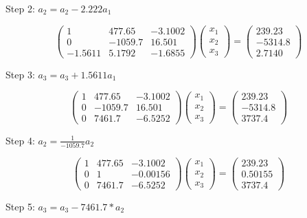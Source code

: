 \documentclass[]{article}
\begin{document}
Step 2: \(a_2 = a_2 - 2.222a_1\)

\[
\left(\begin{array}{ccc} 
1 & 477.65 & -3.1002\\
0 & -1059.7 & 16.501\\
-1.5611 & 5.1792 & -1.6855
\end{array}\right)
\left(\begin{array}{c} 
x_1 \\
x_2 \\
x_3
\end{array}\right) =
\left(\begin{array}{c}
239.23 \\
-5314.8 \\
2.7140
\end{array}\right)
\]

Step 3: \(a_3 = a_3 + 1.5611a_1\)

\[
\left(\begin{array}{ccc} 
1 & 477.65 & -3.1002\\
0 & -1059.7 & 16.501\\
0 & 7461.7 & -6.5252
\end{array}\right)
\left(\begin{array}{c} 
x_1 \\
x_2 \\
x_3
\end{array}\right) =
\left(\begin{array}{c}
239.23 \\
-5314.8 \\
3737.4
\end{array}\right)
\]

Step 4: \(a_2 = \frac1{-1059.7}a_2\)

\[
\left(\begin{array}{ccc} 
1 & 477.65 & -3.1002\\
0 & 1 & -0.00156\\
0 & 7461.7 & -6.5252
\end{array}\right)
\left(\begin{array}{c} 
x_1 \\
x_2 \\
x_3
\end{array}\right) =
\left(\begin{array}{c}
239.23 \\
0.50155 \\
3737.4
\end{array}\right)
\]

Step 5: \(a_3 = a_3 - 7461.7 * a_2\)
\end{document}
